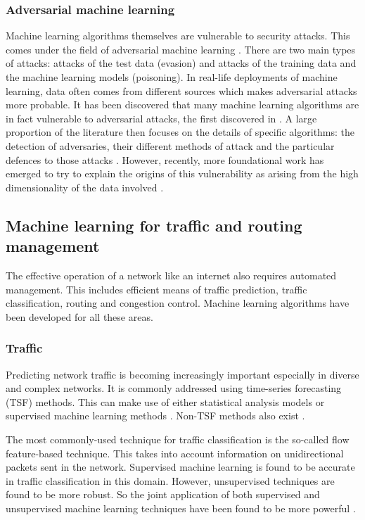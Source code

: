 \documentclass[twocolumn, aps, rmp, amsmath, amssymb, nofootinbib, superscriptaddress, longbibliography, floatfix, table-of-contents, eqsecnum]{revtex4-2}
\begin{document}
\subsubsection{Adversarial machine learning} 

Machine learning algorithms themselves are vulnerable to security attacks. This comes under the field of adversarial machine learning \cite{huang2011adversarial}. There are two main types of attacks: attacks of the test data (evasion) and attacks of the training data and the machine learning models (poisoning). In real-life deployments of machine learning, data often comes from different sources which makes adversarial attacks more probable. It has been discovered that many machine learning algorithms are in fact vulnerable to adversarial attacks, the first discovered in \cite{szegedy2013intriguing}. A large proportion of the literature then focuses on the details of specific algorithms: the detection of adversaries, their different methods of attack and the particular defences to those attacks \cite{kurakin2018adversarial}. However, recently, more foundational work has emerged to try to explain the origins of this vulnerability as arising from the high dimensionality of the data involved \cite{goodfellow2014explaining, gilmer2018adversarial, mahloujifar2018curse}.

\subsection{Machine learning for traffic and routing management}
The effective operation of a network like an internet also requires automated management. This includes efficient means of traffic prediction, traffic classification, routing and congestion control. Machine learning algorithms have been developed for all these areas.

\subsubsection{Traffic}

Predicting network traffic is becoming increasingly important especially in diverse and complex networks. It is commonly addressed using time-series forecasting (TSF) methods. This can make use of either statistical analysis models or supervised machine learning methods \cite{bermolen2009support, chabaa2010identification, cortez2006internet}. Non-TSF methods also exist \cite{chen2016predicting, li2016inter}.

The most commonly-used technique for traffic classification is the so-called flow feature-based technique. This takes into account information on unidirectional packets sent in the network. Supervised machine learning is found to be accurate in traffic classification in this domain. However, unsupervised techniques are found to be more robust. So the joint application of both supervised and unsupervised machine learning techniques have been found to be more powerful \cite{erman2007offline, zhang2015robust}.
\end{document}
